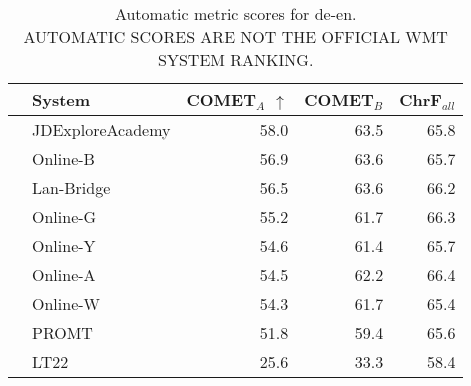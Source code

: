 \begin{table}
\centering
\caption{Automatic metric scores for de-en. \\AUTOMATIC SCORES ARE NOT THE OFFICIAL WMT SYSTEM RANKING.}
\begin{tabular}{llrrr}
\toprule
          &            System &  COMET$_{A}$ $\uparrow$ &  COMET$_{B}$ &  ChrF$_{all}$ \\
\midrule
 \Const{} &  JDExploreAcademy &                    58.0 &         63.5 &          65.8 \\
 \Uncon{} &          Online-B &                    56.9 &         63.6 &          65.7 \\
 \Uncon{} &        Lan-Bridge &                    56.5 &         63.6 &          66.2 \\
 \Uncon{} &          Online-G &                    55.2 &         61.7 &          66.3 \\
 \Uncon{} &          Online-Y &                    54.6 &         61.4 &          65.7 \\
 \Uncon{} &          Online-A &                    54.5 &         62.2 &          66.4 \\
 \Uncon{} &          Online-W &                    54.3 &         61.7 &          65.4 \\
 \Uncon{} &             PROMT &                    51.8 &         59.4 &          65.6 \\
 \Const{} &              LT22 &                    25.6 &         33.3 &          58.4 \\
\bottomrule
\end{tabular}
\end{table}



